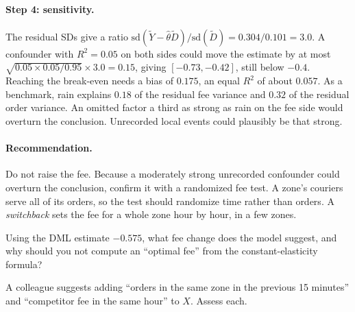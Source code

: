 \documentclass[11pt]{article}
\begin{document}
\paragraph{Step 4: sensitivity.} The residual SDs give a ratio $\text{sd}(\tilde Y - \hat\theta\tilde D)/\text{sd}(\tilde D) = 0.304/0.101 = 3.0$. A confounder with
$R^2 = 0.05$ on both sides could move the estimate by at most $\sqrt{0.05 \times 0.05/0.95} \times 3.0 = 0.15$, giving $[-0.73, -0.42]$, still below
$-0.4$. Reaching the break-even needs a bias of $0.175$, an equal $R^2$ of about $0.057$. As a benchmark, rain explains $0.18$ of the residual fee
variance and $0.32$ of the residual order variance. An omitted factor a third as strong as rain on the fee side would overturn the
conclusion. Unrecorded local events could plausibly be that strong.

\paragraph{Recommendation.} Do not raise the fee. Because a moderately strong unrecorded confounder could overturn the conclusion,
confirm it with a randomized fee test. A zone's couriers serve all of its orders, so the test should randomize time rather than
orders. A \emph{switchback} sets the fee for a whole zone hour by hour, in a few zones.

\begin{exercise}[computation]
Using the DML estimate $-0.575$, what fee change does the model suggest, and why should you not compute an ``optimal fee'' from the constant-elasticity formula?
\end{exercise}

\begin{exercise}[judgment]
A colleague suggests adding ``orders in the same zone in the previous 15 minutes'' and ``competitor fee in the same hour'' to $X$. Assess
each.
\end{exercise}
\end{document}
